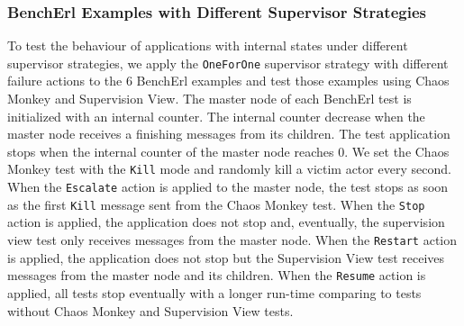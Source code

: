 \subsubsection{BenchErl Examples with Different Supervisor Strategies}
\label{bencherl_chaos_test}

To test the behaviour of applications with internal states under 
different supervisor strategies, we apply the {\tt OneForOne} supervisor 
strategy with different failure actions to the 6 BenchErl examples and test 
those examples using Chaos Monkey and Supervision View.  The master node of 
each BenchErl test is initialized with an internal counter.  The internal 
counter decrease when the master node receives a finishing messages from its 
children.  The test application stops when the internal counter of the master 
node reaches 0.  We set the Chaos Monkey test with the {\tt Kill} mode and 
randomly kill a victim actor every second.  When the {\tt Escalate} action is 
applied to the master node, the test stops as soon as the first {\tt Kill} 
message sent from the Chaos Monkey test.  When the {\tt Stop} action is applied, 
the application does not stop and, eventually, the supervision view test only 
receives messages from the master node.  When the {\tt Restart} action is 
applied, the application does not stop but the Supervision View test receives 
messages from the master node and its children.  When the {\tt Resume} action is 
applied, all tests stop eventually with a longer run-time comparing to tests 
without Chaos Monkey and Supervision View tests.


